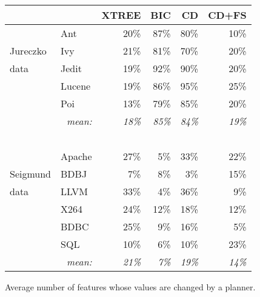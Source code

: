 \begin{figure}[!t]
\centering
{\small
\begin{tabular}{l|lrrrr}
  \hline
  \rowcolor{lightgray}
 &       & XTREE & BIC   & CD   &CD+FS \\\hline
&Ant    & 20\% & 87\% & 80\% & 10\%  \\
Jureczko&Ivy    & 21\% & 81\% & 70\% & 20\%  \\
data&Jedit  & 19\% & 92\% & 90\% & 20\%  \\
&Lucene & 19\% & 86\% & 95\% & 25\%  \\
&Poi    & 13\% & 79\% & 85\% & 20\%   \\\hline
\multicolumn{2}{r}{{\em mean:}}& {\em 18\%} & {\em 85\%} & {\em 84\%} & {\em 19\%}\\
\multicolumn{2}{r}{~}\\\hline
 &Apache & 27\% & 5\% & 33\% & 22\% \\
Seigmund&BDBJ & 7\% & 8\% & 3\% & 15\% \\
data&LLVM & 33\% & 4\% & 36\% & 9\% \\
&X264 & 24\% & 12\% & 18\% & 12\% \\
&BDBC & 25\% & 9\% & 16\% & 5\% \\
&SQL & 10\% & 6\% & 10\% & 23\% \\\hline
\multicolumn{2}{r}{{\em mean:}} & {\em 21\% } & {\em 7\% } & {\em 19\% } & {\em 14\%}
\end{tabular}}
\noindent
\caption{Average number of features whose values are changed by a planner.}\label{fig:types}
\end{figure}